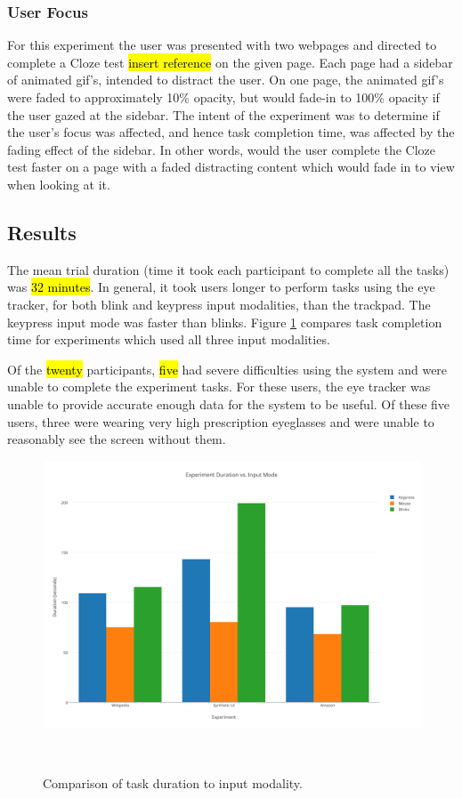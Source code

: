 \documentclass{sigchi}
\begin{document}
\subsubsection{User Focus}
For this experiment the user was presented with two webpages and directed to complete a Cloze test \hl{insert reference} on the given page. Each page had a sidebar of animated gif's, intended to distract the user. On one page, the animated gif's were faded to approximately 10\% opacity, but would fade-in to 100\% opacity if the user gazed at the sidebar. The intent of the experiment was to determine if the user's focus was affected, and hence task completion time, was affected by the fading effect of the sidebar. In other words, would the user complete the Cloze test faster on a page with a faded distracting content which would fade in to view when looking at it.


\subsection{Results}
The mean trial duration (time it took each participant to complete all the tasks) was \hl{32 minutes}. In general, it took users longer to perform tasks using the eye tracker, for both blink and keypress input modalities, than the trackpad. The keypress input mode was faster than blinks. Figure \ref{fig:task-durations} compares task completion time for experiments which used all three input modalities.

Of the \hl{twenty} participants, \hl{five} had severe difficulties using the system and were unable to complete the experiment tasks. For these users, the eye tracker was unable to provide accurate enough data for the system to be useful. Of these five users, three were wearing very high prescription eyeglasses and were unable to reasonably see the screen without them.

\begin{figure}
\centering
  \includegraphics[width=0.9\columnwidth]{figures/task-durations.pdf}
  \caption{Comparison of task duration to input modality.
  }~\label{fig:task-durations}
\end{figure}
\end{document}
